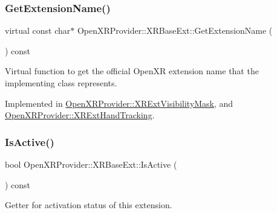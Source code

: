 \subsubsection{\texorpdfstring{GetExtensionName()}{GetExtensionName()}}
{\footnotesize\ttfamily virtual const char$\ast$ Open\+X\+R\+Provider\+::\+X\+R\+Base\+Ext\+::\+Get\+Extension\+Name (\begin{DoxyParamCaption}{ }\end{DoxyParamCaption}) const\hspace{0.3cm}{\ttfamily [pure virtual]}}



Virtual function to get the official Open\+XR extension name that the implementing class represents. 



Implemented in \mbox{\hyperlink{class_open_x_r_provider_1_1_x_r_ext_visibility_mask_a7560c4d28687a01f8b7ef80107d09b20}{Open\+X\+R\+Provider\+::\+X\+R\+Ext\+Visibility\+Mask}}, and \mbox{\hyperlink{class_open_x_r_provider_1_1_x_r_ext_hand_tracking_a8706a0fc581e47e3b15fd6b58c9d5266}{Open\+X\+R\+Provider\+::\+X\+R\+Ext\+Hand\+Tracking}}.

\mbox{\label{class_open_x_r_provider_1_1_x_r_base_ext_a40bce34f078349e639139ea85b630ac3}} 
\subsubsection{\texorpdfstring{IsActive()}{IsActive()}\hspace{0.1cm}{\footnotesize\ttfamily [1/2]}}
{\footnotesize\ttfamily bool Open\+X\+R\+Provider\+::\+X\+R\+Base\+Ext\+::\+Is\+Active (\begin{DoxyParamCaption}{ }\end{DoxyParamCaption}) const\hspace{0.3cm}{\ttfamily [inline]}}



Getter for activation status of this extension. 

\mbox{\label{class_open_x_r_provider_1_1_x_r_base_ext_a19dd6d3922ebeb2f64402f2dcc23245b}} 
